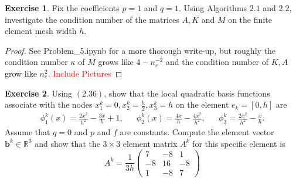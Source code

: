 \documentclass{amsart}
\theoremstyle{plain}
\theoremstyle{definition}
\newtheorem{exer}{Exercise}[section]
\newcommand{\R}{\mathbb{R}}
\newcommand{\tcr}[1]{\textcolor{red}{#1}}
\begin{document}
\begin{exer}
    Fix the coefficients $p=1$ and $q=1.$ Using Algorithms $2.1$ and $2.2$, investigate the condition number of the matrices $A,K$ and $M$ on the finite element mesh width $h$.
\end{exer}
\begin{proof}
    See Problem\_5.ipynb for a more thorough write-up, but roughly the condition number $\kappa$ of $M$ grows like $4-n_e^{-2}$ and the condition number of $K,A$ grow like $n_e^2.$
    \tcr{Include Pictures}
\end{proof}

\begin{exer}
    Using $(2.36)$, show that the local quadratic basis functions associate with the nodes $x_1^k = 0, x_2^k = \frac{h}{2}, x_3^k = h$ on the element $e_k = [0,h]$ are 
    \begin{align*}
        \phi_1^k(x) = \frac{2x^2}{h^2}-\frac{3x}{h}+ 1, && \phi_2^k(x) = \frac{4x}{h}-\frac{4x^2}{h^2}, && \phi_3^k = \frac{2x^2}{h^2}-\frac{x}{h}.
    \end{align*}
    Assume that $q=0$ and $p$ and $f$ are constants. Compute the element vector $\mathbf{b}^k \in \R^3$ and show that the $3\times3$ element matrix $A^k$ for this specific element is 
    $$A^k = \frac{1}{3h}\begin{pmatrix}
        7 & -8 & 1 \\ -8 & 16 & -8\\ 1 & -8 & 7 
    \end{pmatrix}$$
\end{exer}
\end{document}

